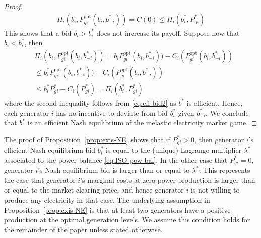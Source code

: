 \documentclass[journal]{IEEEtran}
\newcommand{\1}{\mathds 1}
\renewcommand{\l}{\lambda}
\theoremstyle{remark}
\theoremstyle{definition}
\newcommand{\marginac}[1]{\marginpar{\color{magenta}\tiny\ttfamily#1}}
\begin{document}
\begin{proof}
\begin{align*}
    \Pi_i(b_i,P_{gi}^{\text{opt}}(b_i,b_{-i}^*))=C(0)\leq \Pi_i(b_i^*,P_{gi}^*)
  \end{align*}
  This shows that a bid $b_i > b_i^*$ does not increase its payoff. 
  Suppose now that $b_i<b_i^*$, then
  \begin{align*}
    &\Pi_i(b_i,P_{gi}^{\text{opt}}(b_i,b_{-i}^*)) =
    b_iP_{gi}^{\text{opt}}(b_i,b_{-i}^*)) -
    C_i(P_{gi}^{\text{opt}}(b_i,b_{-i}^*))
    \\
    &\leq b_i^* P_{gi}^{\text{opt}}(b_i,b_{-i}^*)) -
    C_i(P_{gi}^{\text{opt}}(b_i,b_{-i}^*))
    \\
    &\leq b_i^*P^*_{gi}-C_i(P^*_{gi})=\Pi_i(b_i^*,P^*_{gi})
  \end{align*}
  where the second inequality follows from \eqref{eq:eff-bid2} as $b^*$
  is efficient. Hence, each generator $i$ has no incentive to deviate from
  bid $b_i^*$ given $b_{-i}^*$. We conclude that $b^*$ is an efficient
  Nash equilibrium of the inelastic electricity market game. 
\end{proof}

The proof of Proposition~\ref{prop:exis-NE} shows that if
$P_{gi}^*>0$, then generator $i$'s efficient Nash equilibrium bid
$b_i^*$ is equal to the (unique) Lagrange multiplier $\l^*$ associated
to the power balance \eqref{eq:ISO-pow-bal}.
%
%
In the other case that $P_{gi}^*=0$, generator $i$'s Nash equilibrium
bid is larger than or equal to $\l^*$. This represents the case that
generator $i$'s marginal costs at zero power production is larger than
or equal to the market clearing price, and hence generator $i$ is not
willing to produce any electricity in that case. The underlying
assumption in Proposition~\ref{prop:exis-NE} is that at least two
generators have a positive production at the optimal generation
levels. We assume this condition holds for the remainder of the paper
unless stated otherwise.
\end{document}
